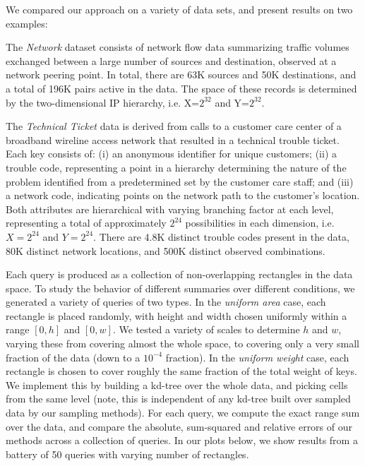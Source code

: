 \documentclass[11pt]{article}
\newcommand{\para}[1]{\medskip \noindent {\bf #1}}
\begin{document}
\para{Data Sets and Query Sets.}
We compared our approach on a variety of data sets,
and present results on two examples:
\begin{trivlist}
\item The {\em Network} dataset consists of network flow data summarizing
  traffic volumes exchanged between a large number of sources and
  destination, observed at a network peering point.
In total, there are 63K sources and 50K destinations, and a total of
196K pairs active in the data.
The space of these records is determined by the two-dimensional IP
hierarchy, i.e. X=$2^{32}$ and Y=$2^{32}$.

\item
The {\em Technical Ticket} data is derived from calls to a customer
care center of a broadband wireline access network that resulted in a
technical trouble ticket. 
Each key consists of: (i) an anonymous identifier for unique
customers; (ii) a trouble code, representing a point in a
hierarchy determining the nature of the problem identified from a
predetermined set by the customer care staff; and (iii) a network code,
indicating points on the network path to the customer's location.  
Both attributes are hierarchical with varying branching factor at each
level, representing a total of approximately $2^{24}$ possibilities
in each dimension, i.e. $X=2^{24}$ and $Y=2^{24}$. 
There are 4.8K distinct trouble codes present in the data, 
80K distinct network
locations, and 500K distinct observed combinations. 
\end{trivlist}

Each query is produced as a collection of non-overlapping rectangles
in the data space.
To study the behavior of different summaries over
different conditions, we generated a variety of queries of two types. 
In the {\em uniform area} case, 
each rectangle is placed randomly, with height and width chosen
uniformly within a range $[0, h]$ and $[0,w]$. 
We tested a variety of scales to determine $h$ and $w$, varying these
from covering almost the whole space, to covering only a very small
fraction of the data (down to a $10^{-4}$ fraction). 
In the {\em uniform weight} case, 
each rectangle is chosen to cover roughly the same fraction of the
total weight of keys.
We implement this by building a kd-tree over the whole data, and
picking cells from the same level (note, this is independent of any
kd-tree built over sampled data by our sampling methods). 
For each query, we compute the exact range sum over the data, and
compare the absolute, sum-squared and relative errors of our methods
across a collection of queries. 
In our plots below, we show results from a battery of 50 queries with
varying number of rectangles.
\end{document}
